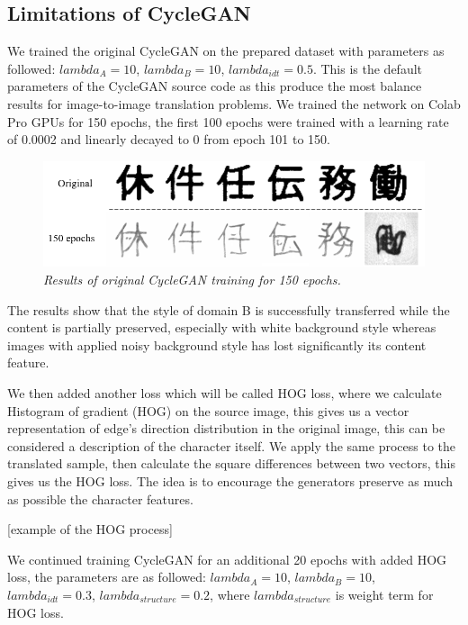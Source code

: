 \documentclass[12pt]{report}
\begin{document}
\subsection{Limitations of CycleGAN}

We trained the original CycleGAN on the prepared dataset with parameters as followed: $lambda_A = 10$, $lambda_B = 10$, $lambda_{idt} = 0.5$. This is the default parameters of the CycleGAN source code as this produce the most balance results for image-to-image translation problems. We trained the network on Colab Pro GPUs for 150 epochs, the first 100 epochs were trained with a learning rate of 0.0002 and linearly decayed to 0 from epoch 101 to 150.

\begin{figure}[h]
	\centering
	\includegraphics[scale=0.8]{150-epochs}
	\caption{\textit{Results of original CycleGAN training for 150 epochs.}}
	\label{fig:150-epochs}
\end{figure}

The results show that the style of domain B is successfully transferred while the content is partially preserved, especially with white background style whereas images with applied noisy background style has lost significantly its content feature. 

We then added another loss which will be called HOG loss, where we calculate Histogram of gradient (HOG) \cite{hog} on the source image, this gives us a vector representation of edge's direction distribution in the original image, this can be considered a description of the character itself. We apply the same process to the translated sample, then calculate the square differences between two vectors, this gives us the HOG loss. The idea is to encourage the generators preserve as much as possible the character features.

[example of the HOG process]

We continued training CycleGAN for an additional 20 epochs with added HOG loss, the parameters are as followed: $lambda_A = 10$, $lambda_B = 10$, $lambda_{idt} = 0.3$, $lambda_{structure} = 0.2$, where $lambda_{structure}$ is weight term for HOG loss.
\end{document}
